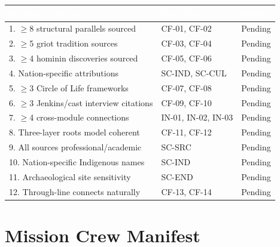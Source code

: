 \documentclass[11pt,letterpaper]{article}
\newcommand{\tableheader}[1]{\textbf{\sffamily\textcolor{white}{#1}}}
\begin{document}
\begin{center}
\begin{tabularx}{\textwidth}{XL{3cm}C{1.5cm}}
\toprule
{}
\tableheader{Success Criterion} & \tableheader{Test ID(s)} & \tableheader{Status} \\
. $\geq$8 structural parallels sourced & CF-01, CF-02 & Pending \\
2. $\geq$5 griot tradition sources & CF-03, CF-04 & Pending \\
3. $\geq$4 hominin discoveries sourced & CF-05, CF-06 & Pending \\
4. Nation-specific attributions & SC-IND, SC-CUL & Pending \\
5. $\geq$3 Circle of Life frameworks & CF-07, CF-08 & Pending \\
6. $\geq$3 Jenkins/cast interview citations & CF-09, CF-10 & Pending \\
7. $\geq$4 cross-module connections & IN-01, IN-02, IN-03 & Pending \\
8. Three-layer roots model coherent & CF-11, CF-12 & Pending \\
9. All sources professional/academic & SC-SRC & Pending \\
10. Nation-specific Indigenous names & SC-IND & Pending \\
11. Archaeological site sensitivity & SC-END & Pending \\
12. Through-line connects naturally & CF-13, CF-14 & Pending \\
\bottomrule
\end{tabularx}
\end{center}

\section{Mission Crew Manifest}
\end{document}
